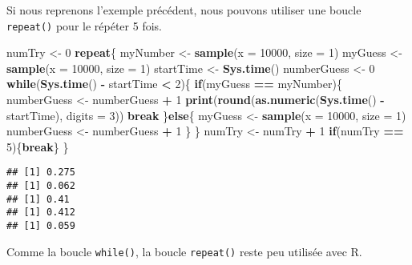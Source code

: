 \documentclass[]{book}
\newenvironment{Shaded}{\begin{snugshade}}{\end{snugshade}}
\newcommand{\KeywordTok}[1]{\textcolor[rgb]{0.13,0.29,0.53}{\textbf{#1}}}
\newcommand{\DataTypeTok}[1]{\textcolor[rgb]{0.13,0.29,0.53}{#1}}
\newcommand{\DecValTok}[1]{\textcolor[rgb]{0.00,0.00,0.81}{#1}}
\newcommand{\StringTok}[1]{\textcolor[rgb]{0.31,0.60,0.02}{#1}}
\newcommand{\ControlFlowTok}[1]{\textcolor[rgb]{0.13,0.29,0.53}{\textbf{#1}}}
\newcommand{\OperatorTok}[1]{\textcolor[rgb]{0.81,0.36,0.00}{\textbf{#1}}}
\newcommand{\NormalTok}[1]{#1}
\theoremstyle{definition}
\theoremstyle{definition}
\theoremstyle{definition}
\theoremstyle{remark}
\begin{document}
Si nous reprenons l'exemple précédent, nous pouvons utiliser une boucle
\texttt{repeat()} pour le répéter 5 fois.

\begin{Shaded}
\begin{Highlighting}[]
\NormalTok{numTry <-}\StringTok{ }\DecValTok{0}
\ControlFlowTok{repeat}\NormalTok{\{}
\NormalTok{  myNumber <-}\StringTok{ }\KeywordTok{sample}\NormalTok{(}\DataTypeTok{x =} \DecValTok{10000}\NormalTok{, }\DataTypeTok{size =} \DecValTok{1}\NormalTok{)}
\NormalTok{  myGuess <-}\StringTok{ }\KeywordTok{sample}\NormalTok{(}\DataTypeTok{x =} \DecValTok{10000}\NormalTok{, }\DataTypeTok{size =} \DecValTok{1}\NormalTok{)}
\NormalTok{  startTime <-}\StringTok{ }\KeywordTok{Sys.time}\NormalTok{()}
\NormalTok{  numberGuess <-}\StringTok{ }\DecValTok{0}
  \ControlFlowTok{while}\NormalTok{(}\KeywordTok{Sys.time}\NormalTok{() }\OperatorTok{-}\StringTok{ }\NormalTok{startTime }\OperatorTok{<}\StringTok{ }\DecValTok{2}\NormalTok{)\{}
    \ControlFlowTok{if}\NormalTok{(myGuess }\OperatorTok{==}\StringTok{ }\NormalTok{myNumber)\{}
\NormalTok{      numberGuess <-}\StringTok{ }\NormalTok{numberGuess }\OperatorTok{+}\StringTok{ }\DecValTok{1}
      \KeywordTok{print}\NormalTok{(}\KeywordTok{round}\NormalTok{(}\KeywordTok{as.numeric}\NormalTok{(}\KeywordTok{Sys.time}\NormalTok{() }\OperatorTok{-}\StringTok{ }\NormalTok{startTime), }\DataTypeTok{digits =} \DecValTok{3}\NormalTok{))}
      \ControlFlowTok{break}
\NormalTok{    \}}\ControlFlowTok{else}\NormalTok{\{}
\NormalTok{      myGuess <-}\StringTok{ }\KeywordTok{sample}\NormalTok{(}\DataTypeTok{x =} \DecValTok{10000}\NormalTok{, }\DataTypeTok{size =} \DecValTok{1}\NormalTok{)}
\NormalTok{      numberGuess <-}\StringTok{ }\NormalTok{numberGuess }\OperatorTok{+}\StringTok{ }\DecValTok{1}
\NormalTok{    \}}
\NormalTok{  \}}
\NormalTok{  numTry <-}\StringTok{ }\NormalTok{numTry }\OperatorTok{+}\StringTok{ }\DecValTok{1}
  \ControlFlowTok{if}\NormalTok{(numTry }\OperatorTok{==}\StringTok{ }\DecValTok{5}\NormalTok{)\{}\ControlFlowTok{break}\NormalTok{\}}
\NormalTok{\}}
\end{Highlighting}
\end{Shaded}

\begin{verbatim}
## [1] 0.275
## [1] 0.062
## [1] 0.41
## [1] 0.412
## [1] 0.059
\end{verbatim}

Comme la boucle \texttt{while()}, la boucle \texttt{repeat()} reste peu
utilisée avec R.
\end{document}
